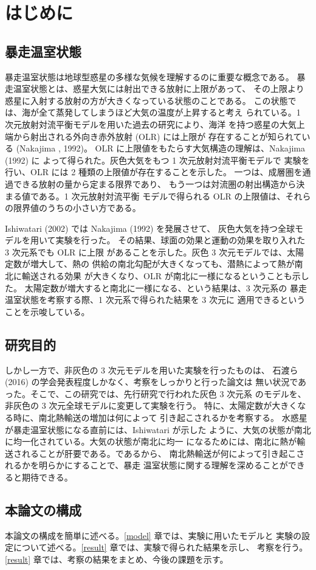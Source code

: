 \documentclass[body]{subfiles}
\begin{document}
\chapter{はじめに}

\section{暴走温室状態}
暴走温室状態は地球型惑星の多様な気候を理解するのに重要な概念である。
暴走温室状態とは、惑星大気には射出できる放射に上限があって、
その上限より惑星に入射する放射の方が大きくなっている状態のことである。
この状態では、海が全て蒸発してしまうほど大気の温度が上昇すると考え
られている。1 次元放射対流平衡モデルを用いた過去の研究により、海洋
を持つ惑星の大気上端から射出される外向き赤外放射 (OLR) には上限が
存在することが知られている (Nakajima \etal*, 1992)。
OLR に上限値をもたらす大気構造の理解は、Nakajima \etal (1992) に
よって得られた。灰色大気をもつ 1 次元放射対流平衡モデルで
実験を行い、OLR には 2 種類の上限値が存在することを示した。
一つは、成層圏を通過できる放射の量から定まる限界であり、
もう一つは対流圏の射出構造から決まる値である。1 次元放射対流平衡
モデルで得られる OLR の上限値は、それらの限界値のうちの小さい方である。

Ishiwatari \etal (2002) では Nakajima \etal (1992) を発展させて、
灰色大気を持つ全球モデルを用いて実験を行った。
その結果、球面の効果と運動の効果を取り入れた 3 次元系でも OLR に上限
があることを示した。灰色 3 次元モデルでは、太陽定数が増大して、熱の
供給の南北勾配が大きくなっても、潜熱によって熱が南北に輸送される効果
が大きくなり、OLR が南北に一様になるということも示した。
太陽定数が増大すると南北に一様になる、という結果は、3 次元系の
暴走温室状態を考察する際、1 次元系で得られた結果を 3 次元に
適用できるということを示唆している。

\section{研究目的}
しかし一方で、非灰色の 3 次元モデルを用いた実験を行ったものは、
石渡ら (2016) の学会発表程度しかなく、考察をしっかりと行った論文は
無い状況であった。そこで、この研究では、先行研究で行われた灰色 3 次元系
のモデルを、非灰色の 3 次元全球モデルに変更して実験を行う。
特に、太陽定数が大きくなる時に、南北熱輸送の増加は何によって
引き起こされるかを考察する。
水惑星が暴走温室状態になる直前には、Ishiwatari  が示した
ように、大気の状態が南北に均一化されている。大気の状態が南北に均一
になるためには、南北に熱が輸送されることが肝要である。であるから、
南北熱輸送が何によって引き起こされるかを明らかにすることで、暴走
温室状態に関する理解を深めることができると期待できる。

\section{本論文の構成}
本論文の構成を簡単に述べる。\ref{model} 章では、実験に用いたモデルと
実験の設定について述べる。\ref{result} 章では、実験で得られた結果を示し、
考察を行う。\ref{result} 章では、考察の結果をまとめ、今後の課題を示す。
\end{document}

